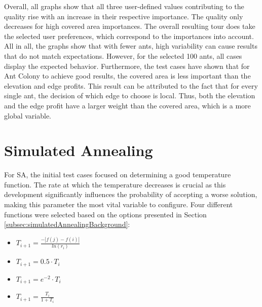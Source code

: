 Overall, all graphs show that all three user-defined values contributing to the quality rise with an increase in their respective importance.
The quality only decreases for high covered area importances.
The overall resulting tour does take the selected user preferences, which correspond to the importances into account.
All in all, the graphs show that with fewer ants, high variability can cause results that do not match expectations.
However, for the selected 100 ants, all cases display the expected behavior.
Furthermore, the test cases have shown that for Ant Colony to achieve good results, the covered area is less important than the elevation and edge profits.
This result can be attributed to the fact that for every single ant, the decision of which edge to choose is local.
Thus, both the elevation and the edge profit have a larger weight than the covered area, which is a more global variable.


\section{Simulated Annealing}


For SA, the initial test cases focused on determining a good temperature function. 
The rate at which the temperature decreases is crucial as this development significantly influences the probability of accepting a worse solution, making this parameter the most vital variable to configure.
Four different functions were selected based on the options presented in Section \ref{subsec:simulatedAnnealingBackground}:

\begin{itemize}
	\item $	T_{i+1} = \frac{- |f(j)-f(i)|}{ln(r_i)}	$
	\item $T_{i+1} = 0.5 \cdot T_i$
	\item $T_{i+1} = e^{-2} \cdot T_i$
	\item $T_{i+1} = \frac{T_i}{1 + T_i}$
\end{itemize}

